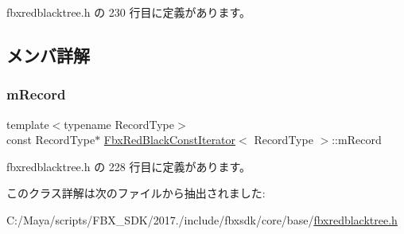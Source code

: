  fbxredblacktree.\+h の 230 行目に定義があります。



\subsection{メンバ詳解}
\mbox{\label{class_fbx_red_black_const_iterator_a81e85ea2f1580a368b2352a72295dd06}} 
\subsubsection{\texorpdfstring{m\+Record}{mRecord}}
{\footnotesize\ttfamily template$<$typename Record\+Type$>$ \\
const Record\+Type$\ast$ \hyperlink{class_fbx_red_black_const_iterator}{Fbx\+Red\+Black\+Const\+Iterator}$<$ Record\+Type $>$\+::m\+Record\hspace{0.3cm}{\ttfamily [protected]}}



 fbxredblacktree.\+h の 228 行目に定義があります。



このクラス詳解は次のファイルから抽出されました\+:\begin{DoxyCompactItemize}
\item 
C\+:/\+Maya/scripts/\+F\+B\+X\+\_\+\+S\+D\+K/2017./include/fbxsdk/core/base/\hyperlink{fbxredblacktree_8h}{fbxredblacktree.\+h}\end{DoxyCompactItemize}
